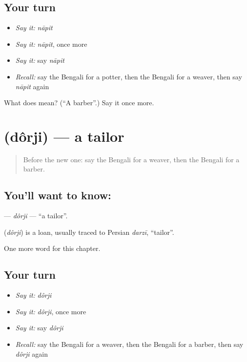 \subsection*{Your turn}
\begin{itemize}
\raggedright
  \item \emph{Say it:} \emph{nāpit}
  \item \emph{Say it:} \emph{nāpit}, once more
  \item \emph{Say it:} say \emph{nāpit}
  \item \emph{Recall:} say the Bengali for a potter, then the Bengali for a weaver, then say \emph{nāpit} again
\end{itemize}

\begin{tcolorbox}[breakable,colback=teal!4,colframe=teal!35!black,title={Before you move on}]
What does  mean? (\textquotedblleft{}A barber\textquotedblright{}.) Say it once more.
\end{tcolorbox}
\section[\texorpdfstring{\bn{দর্জি} (dôrji)}{দর্জি (dôrji)}]{ (dôrji) — a tailor}

\label{lesson:BN-C126-dorji}



\begin{quote}
Before the new one: say the Bengali for a weaver, then the Bengali for a barber.
\end{quote}

\subsection*{You'll want to know: }
\textbf{} — \emph{dôrji} — \textquotedblleft{}a tailor\textquotedblright{}.

\begin{cousinweb}
\textbf{} (\emph{dôrji}) is a loan, usually traced to Persian \emph{darzī}, \textquotedblleft{}tailor\textquotedblright{}.
\end{cousinweb}

\begin{grammarlens}[title={What you've built}]
One more word for this chapter.
\end{grammarlens}

\subsection*{Your turn}
\begin{itemize}
\raggedright
  \item \emph{Say it:} \emph{dôrji}
  \item \emph{Say it:} \emph{dôrji}, once more
  \item \emph{Say it:} say \emph{dôrji}
  \item \emph{Recall:} say the Bengali for a weaver, then the Bengali for a barber, then say \emph{dôrji} again
\end{itemize}


